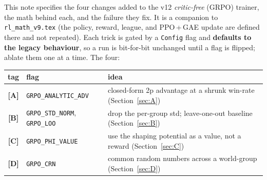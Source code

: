 \documentclass[11pt]{article}
\newcommand{\cd}[1]{\texttt{#1}}
\begin{document}
\begin{center}\small
This note specifies the four changes added to the v12 \emph{critic-free} (GRPO) trainer, the math
behind each, and the failure they fix. It is a companion to \cd{rl\_math\_v9.tex} (the policy,
reward, league, and PPO\,+\,GAE update are defined there and not repeated). Each trick is gated by
a \cd{Config} flag and \textbf{defaults to the legacy behaviour}, so a run is bit-for-bit unchanged
until a flag is flipped; ablate them one at a time. The four:
\begin{center}\small
\begin{tabular}{@{}cll@{}}
\toprule
tag & flag & idea \\
\midrule
\textbf{[A]} & \cd{GRPO\_ANALYTIC\_ADV} & closed-form 2p advantage at a shrunk win-rate (Section~\ref{sec:A}) \\
\textbf{[B]} & \cd{GRPO\_STD\_NORM}, \cd{GRPO\_LOO} & drop the per-group std; leave-one-out baseline (Section~\ref{sec:B}) \\
\textbf{[C]} & \cd{GRPO\_PHI\_VALUE} & use the shaping potential as a value, not a reward (Section~\ref{sec:C}) \\
\textbf{[D]} & \cd{GRPO\_CRN} & common random numbers across a world-group (Section~\ref{sec:D}) \\
\bottomrule
\end{tabular}
\end{center}


\end{center}
\end{document}
